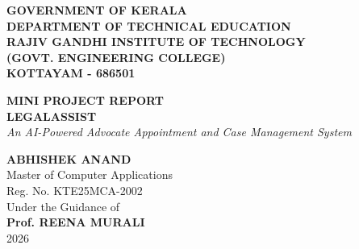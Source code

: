 \documentclass[12pt,a4paper]{report}
\begin{document}
\begin{titlepage}
    \centering
    \vspace*{0.5cm}
    
    {\Large \textbf{GOVERNMENT OF KERALA}}\\[0.2cm]
    {\Large \textbf{DEPARTMENT OF TECHNICAL EDUCATION}}\\[0.4cm]
    {\Large \textbf{RAJIV GANDHI INSTITUTE OF TECHNOLOGY}}\\[0.2cm]
    {\Large \textbf{(GOVT. ENGINEERING COLLEGE)}}\\[0.2cm]
    {\Large \textbf{KOTTAYAM - 686501}}\\[1.2cm]
    
    \begin{figure}[h!]
        \centering
    \end{figure}
    
    \vspace{0.8cm}
    
    {\Huge \textbf{MINI PROJECT REPORT}}\\[1.0cm]
    
    {\Huge \textbf{LEGALASSIST}}\\[0.4cm]
    {\Large \textit{An AI-Powered Advocate Appointment and Case Management System}}\\[1.5cm]
    
    \vfill
    
    {\Large \textbf{ABHISHEK ANAND}}\\[0.2cm]
    {\large Master of Computer Applications}\\[0.2cm]
    {\large Reg. No. KTE25MCA-2002}\\[0.6cm]
    
    {\large Under the Guidance of}\\[0.2cm]
    {\large \textbf{Prof. REENA MURALI}}\\[1.2cm]
    
    {\large 2026}
\end{titlepage}
\end{document}
